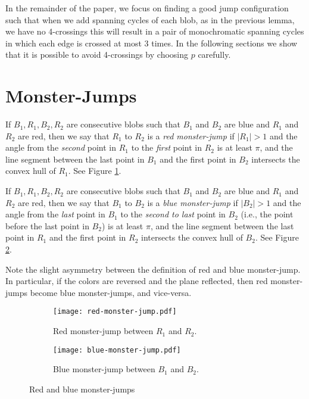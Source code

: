 \documentclass[12pt]{article}
\theoremstyle{definition}
\begin{document}
In the remainder of the paper, we focus on finding a good jump configuration such that when we add spanning cycles of each blob, as in the previous lemma, we have no 4-crossings \textemdash this will result in a pair of monochromatic spanning cycles in which each edge is crossed at most 3 times. In the following sections we show that it is possible to avoid 4-crossings by choosing $p$ carefully.

\section{Monster-Jumps}

If $B_1,R_1,B_2,R_2$ are consecutive blobs such that $B_1$ and $B_2$ are blue and $R_1$ and $R_2$ are red, then we say that $R_1$ to $R_2$ is a \emph{red monster-jump} if $|R_1|>1$ and the angle from the \emph{second} point in $R_1$ to the \emph{first} point in $R_2$ is at least $\pi$, and the line segment between the last point in $B_1$ and the first point in $B_2$ intersects the convex hull of $R_1$. See Figure \ref{fig:red-monster-jump}.

If $B_1,R_1,B_2,R_2$ are consecutive blobs such that $B_1$ and $B_2$ are blue and $R_1$ and $R_2$ are red, then we say that $B_1$ to $B_2$ is a \emph{blue monster-jump} if $|B_2|>1$ and the angle from the \emph{last} point in $B_1$ to the \emph{second to last} point in $B_2$ (i.e., the point before the last point in $B_2$) is at least $\pi$, and the line segment between the last point in $R_1$ and the first point in $R_2$ intersects the convex hull of $B_2$. See Figure \ref{fig:blue-monster-jump}.

Note the slight asymmetry between the definition of red and blue monster-jump.
In particular, if the colors are reversed and the plane reflected, then red monster-jumps become blue monster-jumps, and vice-versa.

\begin{figure}
\centering
\begin{subfigure}[b]{0.4\textwidth}
\centering
\texttt{[image: red-monster-jump.pdf]}
\caption{Red monster-jump between $R_1$ and $R_2$.}
\label{fig:red-monster-jump}
\end{subfigure}
\quad
\begin{subfigure}[b]{0.4\textwidth}
\centering
\texttt{[image: blue-monster-jump.pdf]}
\caption{Blue monster-jump between $B_1$ and $B_2$.}
\label{fig:blue-monster-jump}
\end{subfigure}
\caption{Red and blue monster-jumps}
\label{fig:monster-jumps}
\end{figure}
\end{document}

